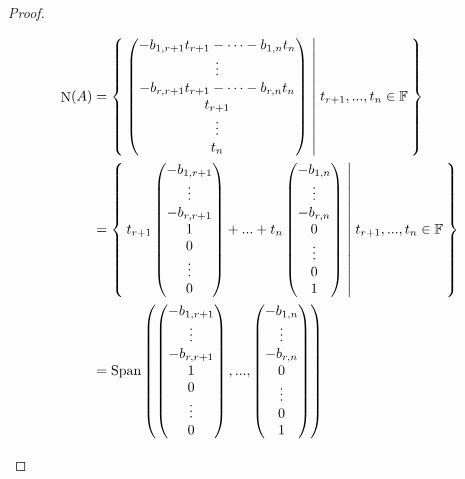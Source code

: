 \documentclass[12pt]{report}
\theoremstyle{plain}
\theoremstyle{definition}
\newcommand{\F}{\mathbb{F}}
\newcommand{\0}{\mathbf{0}}
\DeclareMathOperator{\Span}{Span}
\DeclareMathOperator{\Null}{N}
\begin{document}
\begin{teacher}
\begin{proof}
\begin{enumerate}[label=\alph*.]
$$
\begin{aligned} 
\Null(A)&=\Set{ \begin{pmatrix}
-b_{1,r+1}t_{r+1}-\cdots-b_{1,n}t_n \\
\vdots \\
-b_{r,r+1}t_{r+1}-\cdots-b_{r,n}t_n \\ 
t_{r+1} \\ 
\vdots \\ 
t_n 
\end{pmatrix}|t_{r+1},...,t_n\in\F} \\ 
&=\Set{t_{r+1}\begin{pmatrix} -b_{1,r+1} \\ 
\vdots \\ 
-b_{r,r+1} \\ 
1 \\ 
0 \\ 
\vdots \\ 
0 
\end{pmatrix}+...+t_n\begin{pmatrix} 
-b_{1,n} \\ 
\vdots \\ 
-b_{r,n} \\ 
0 \\ 
\vdots \\ 
0 \\ 
1 
\end{pmatrix}|t_{r+1},...,t_n\in\F} \\ 
&=\Span\left(\begin{pmatrix} -b_{1,r+1} \\ \vdots \\ -b_{r,r+1} \\ 1 \\ 0 \\ \vdots \\ 0 \end{pmatrix},...,\begin{pmatrix} -b_{1,n} \\ \vdots \\ -b_{r,n} \\ 0 \\ \vdots \\ 0 \\ 1 \end{pmatrix}\right)
\end{aligned}
$$


\end{enumerate}
\end{proof}
\end{teacher}
\end{document}
